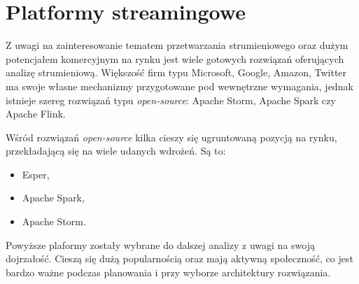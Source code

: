 \section{Platformy streamingowe}
Z uwagi na zainteresowanie tematem przetwarzania strumieniowego oraz dużym potencjałem komercyjnym
na rynku jest wiele gotowych rozwiązań oferujących analizę strumieniową.
Większość firm typu Microsoft, Google, Amazon, Twitter ma swoje własne mechanizmy przygotowane pod
wewnętrzne wymagania, jednak istnieje szereg rozwiązań typu \textit{open-source}:
Apache Storm, Apache Spark czy Apache Flink.

Wśród rozwiązań \textit{open-source} kilka cieszy się ugruntowaną pozycją na rynku,
przekładającą się na wiele udanych wdrożeń.
Są to:
\begin{itemize}
	\item Esper,
	\item Apache Spark,
	\item Apache Storm.
\end{itemize}
Powyższe plaformy zostały wybrane do dalszej analizy z uwagi na swoją dojrzałość.
Cieszą się dużą popularnością oraz mają aktywną społeczność,
co jest bardzo ważne podczas planowania i przy wyborze architektury rozwiązania.




